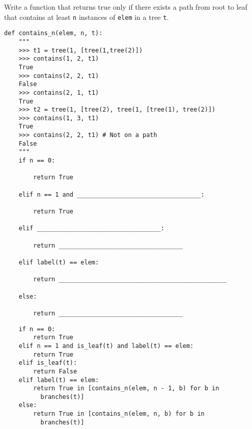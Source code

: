 \begin{blocksection}
\question Write a function that returns true only if there exists a path from root to leaf that contains at least \lstinline$n$ instances of \lstinline$elem$ in a tree \lstinline$t$.

\begin{lstlisting}
def contains_n(elem, n, t):
    """
    >>> t1 = tree(1, [tree(1,tree(2)])
    >>> contains(1, 2, t1)
    True
    >>> contains(2, 2, t1)
    False
    >>> contains(2, 1, t1)
    True
    >>> t2 = tree(1, [tree(2), tree(1, [tree(1), tree(2)])
    >>> contains(1, 3, t1)
    True
    >>> contains(2, 2, t1) # Not on a path
    False
    """
    if n == 0:
    
        return True
        
    elif n == 1 and __________________________________:
    
        return True
        
    elif __________________________________:
    
        return __________________________________
        
    elif label(t) == elem:
    
        return ______________________________________________
        
    else:
    
        return __________________________________
\end{lstlisting}

\begin{solution}
\begin{lstlisting}
    if n == 0:
        return True
    elif n == 1 and is_leaf(t) and label(t) == elem:
        return True
    elif is_leaf(t):
        return False
    elif label(t) == elem:
        return True in [contains_n(elem, n - 1, b) for b in     
          branches(t)]
    else:
        return True in [contains_n(elem, n, b) for b in 
          branches(t)]
\end{lstlisting}
\end{solution}
\end{blocksection}
